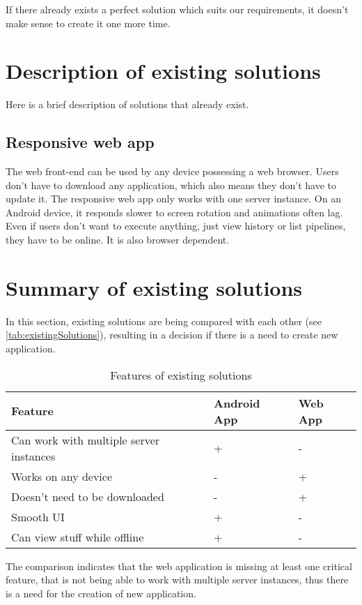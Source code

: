 If there already exists a perfect solution which suits our requirements, it doesn't make sense to create it one more time.

\section{Description of existing solutions}
Here is a brief description of solutions that already exist.

\subsection{Responsive web app}
The web front-end can be used by any device possessing a web browser.
Users don't have to download any application, which also means they don't have to update it.
The responsive web app only works with one server instance.
On an Android device, it responds slower to screen rotation and animations often lag.
Even if users don't want to execute anything, just view history or list pipelines, they have to be online.
It is also browser dependent.

\section{Summary of existing solutions}
In this section, existing solutions are being compared with each other (see \autoref{tab:existingSolutions}), resulting in a decision if there is a need to create new application.

\begin{table}[ht]\centering
\caption[Existing solutions]{Features of existing solutions}\label{tab:existingSolutions}
\begin{tabular}{l|l|l}
\hline
\textbf{Feature} & \textbf{Android App} & \textbf{Web App} \\ \hline
Can work with multiple server instances & + & - \\ \hline
Works on any device & - & + \\ \hline
Doesn't need to be downloaded & - & + \\ \hline
Smooth UI & + & - \\ \hline
Can view stuff while offline & + & - \\ \hline
\end{tabular}
\end{table}

The comparison indicates that the web application is missing at least one critical feature, that is not being able to work with multiple server instances, thus there is a need for the creation of new application.
